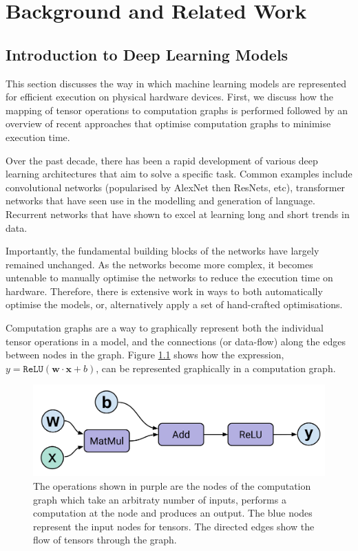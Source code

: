 \chapter{Background and Related Work}

\section{Introduction to Deep Learning Models}
This section discusses the way in which machine learning models are represented for efficient execution on physical hardware devices. First, we discuss how the mapping of tensor operations to computation graphs is performed followed by an overview of recent approaches that optimise computation graphs to minimise execution time.

Over the past decade, there has been a rapid development of various deep learning architectures that aim to solve a specific task. Common examples include convolutional networks (popularised by AlexNet then ResNets, etc), transformer networks that have seen use in the modelling and generation of language. Recurrent networks that have shown to excel at learning long and short trends in data.

Importantly, the fundamental building blocks of the networks have largely remained unchanged.  As the networks become more complex, it becomes untenable to manually optimise the networks to reduce the execution time on hardware. Therefore, there is extensive work in ways to both automatically optimise the models, or, alternatively apply a set of hand-crafted optimisations.

Computation graphs are a way to graphically represent both the individual tensor operations in a model, and the connections (or data-flow) along the edges between nodes in the graph. Figure \ref{fig:bg:perceptron} shows how the expression, $y = \texttt{ReLU}(\mathbf{w} \cdot \mathbf{x} + b)$, can be represented graphically in a computation graph.

\begin{figure}[ht]
  \centering
  \includegraphics[width=0.75\columnwidth]{sections/2background/images/dataflow}
  \caption[Single perceptron as a dataflow (computation) graph]{The operations shown in purple are the nodes of the computation graph which take an arbitraty number of inputs, performs a computation at the node and produces an output. The blue nodes represent the input nodes for tensors. The directed edges show the flow of tensors through the graph.}
  \label{fig:bg:perceptron}
\end{figure}

